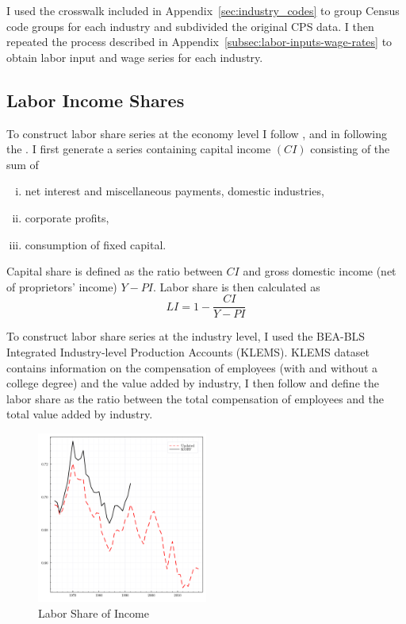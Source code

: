 \documentclass[12pt]{article}
\begin{document}
I used the crosswalk included in Appendix~\ref{sec:industry_codes} to group Census code groups for each industry and subdivided the original CPS data. I then repeated the process described in Appendix~\ref{subsec:labor-inputs-wage-rates} to obtain labor input and wage series for each industry.


\subsection{Labor Income Shares}\label{sec:labor_share_income}
To construct labor share series at the economy level I follow \citet{krusell2000capital}, \citet{castex2022decline} and \citet{ohanian2021revisiting} in following the \citet*{cooley1995frontiers}. I first generate a series containing capital income $(CI)$ consisting of the sum of 
\begin{enumerate}[(i)]
 \item net interest and miscellaneous payments, domestic industries,
 \item corporate profits,
 \item consumption of fixed capital.
\end{enumerate}
Capital share is defined as the ratio between $CI$ and gross domestic income (net of proprietors' income) $Y - PI$. Labor share is then calculated as 
\begin{equation*}
 LI = 1 - \frac{CI}{Y - PI}
\end{equation*}

To construct labor share series at the industry level, I used the BEA-BLS Integrated Industry-level Production Accounts (KLEMS). KLEMS dataset contains information on the compensation of employees (with and without a college degree) and the value added by industry, I then follow \citep{karabarbounis2014global} and define the labor share as the ratio between the total compensation of employees and the total value added by industry.

\begin{figure}%
\centering
\includegraphics[width=0.5\textwidth]{../images/fig:labor_share_updated.pdf}
\caption{\label{fig:labor_share_updated} Labor Share of Income}
\end{figure}
\end{document}
